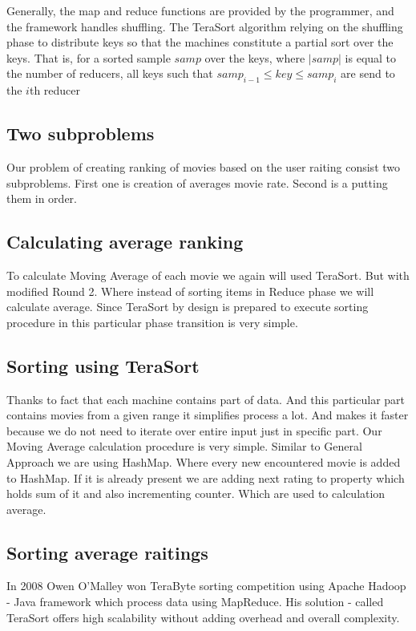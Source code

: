 Generally, the map and reduce functions are provided by the programmer, and the
framework handles shuffling. The TeraSort algorithm relying on the shuffling
phase to distribute keys so that the machines constitute a partial sort over the
keys. That is, for a sorted sample $samp$ over the keys, where $|samp|$ is equal to the
number of reducers, all keys such that $samp_{i-1} \le key \le samp_i$ are send
to the $i$th reducer \citep{minimalmapreduce} 

\subsection{Two subproblems}
Our problem of creating ranking of movies based on the user raiting 
consist two subproblems. First one is creation of averages movie rate.
Second is a putting them in order. 

\subsection{Calculating average ranking}
To calculate Moving Average of each movie we again will used TeraSort.
But with modified Round 2. Where instead of sorting items in Reduce phase
we will calculate average. Since TeraSort by design is prepared to execute
sorting procedure in this particular phase transition is very simple.

\subsection{Sorting using TeraSort}
Thanks to fact that each machine contains part of data. And this particular part contains movies from
a given range it simplifies process a lot. And makes it faster because we do not need to iterate over entire
input just in specific part.
Our Moving Average calculation procedure is very simple. Similar to General Approach
we are using HashMap. Where every new encountered movie is added to HashMap. If it is already
present we are adding next rating to property which holds sum of it and also incrementing counter.
Which are used to calculation average.

\subsection{Sorting average raitings}
In 2008 Owen O'Malley won TeraByte sorting competition using Apache Hadoop
- Java framework which process data using MapReduce. His solution - called TeraSort offers
high scalability without adding overhead and overall complexity.

